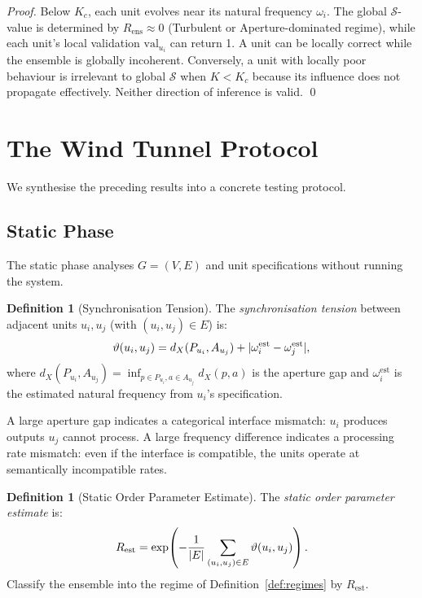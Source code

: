 \documentclass[twocolumn,a4paper,11pt]{article}
\theoremstyle{plain}
\theoremstyle{definition}
\newtheorem{definition}[theorem]{Definition}
\theoremstyle{remark}
\DeclarePairedDelimiter{\abs}{\lvert}{\rvert}
\begin{document}
\begin{proof}
Below $K_c$, each unit evolves near its natural frequency $\omega_i$.
The global $\mathcal{S}$-value is determined by $R_\mathrm{ens} \approx 0$
(Turbulent or Aperture-dominated regime), while each unit's local
validation $\mathrm{val}_{u_i}$ can return 1. A unit can be locally
correct while the ensemble is globally incoherent. Conversely, a unit
with locally poor behaviour is irrelevant to global $\mathcal{S}$ when
$K < K_c$ because its influence does not propagate effectively. Neither
direction of inference is valid. \qed
\end{proof}

\section{The Wind Tunnel Protocol}
\label{sec:protocol}

We synthesise the preceding results into a concrete testing protocol.

\subsection{Static Phase}

The static phase analyses $G = (V, E)$ and unit specifications without
running the system.

\begin{definition}[Synchronisation Tension]
\label{def:sync-tension}
The \emph{synchronisation tension} between adjacent units $u_i, u_j$
(with $(u_i, u_j) \in E$) is:
\[
  \vartheta(u_i, u_j) = d_X(P_{u_i}, A_{u_j}) +
  \abs{\omega_i^\mathrm{est} - \omega_j^\mathrm{est}},
\]
where $d_X(P_{u_i}, A_{u_j}) = \inf_{p \in P_{u_i}, a \in A_{u_j}}
d_X(p, a)$ is the aperture gap and $\omega_i^\mathrm{est}$ is the
estimated natural frequency from $u_i$'s specification.
\end{definition}

A large aperture gap indicates a categorical interface mismatch: $u_i$
produces outputs $u_j$ cannot process. A large frequency difference
indicates a processing rate mismatch: even if the interface is compatible,
the units operate at semantically incompatible rates.

\begin{definition}[Static Order Parameter Estimate]
\label{def:static-regime}
The \emph{static order parameter estimate} is:
\[
  R_\mathrm{est} = \exp\!\left(-\frac{1}{\abs{E}} \sum_{(u_i,u_j) \in E}
  \vartheta(u_i, u_j)\right).
\]
Classify the ensemble into the regime of Definition~\ref{def:regimes} by
$R_\mathrm{est}$.
\end{definition}
\end{document}
